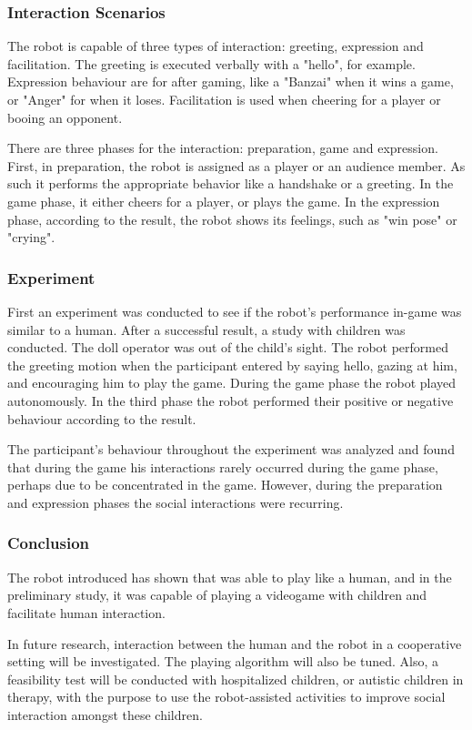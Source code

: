 \documentclass[runningheads]{llncs}
\begin{document}
\subsubsection{Interaction Scenarios}
\par The robot is capable of three types of interaction: greeting, expression and facilitation. The greeting is executed verbally with a "hello", for example. Expression behaviour are for after gaming, like a "Banzai" when it wins a game, or "Anger" for when it loses. Facilitation is used when cheering for a player or booing an opponent.
\par There are three phases for the interaction: preparation, game and expression. First, in preparation, the robot is assigned as a player or an audience member. As such it performs the appropriate behavior like a handshake or a greeting. In the game phase, it either cheers for a player, or plays the game. In the expression phase, according to the result, the robot shows its feelings, such as "win pose" or "crying".

\subsubsection{Experiment}
\par First an experiment was conducted to see if the robot's performance in-game was similar to a human. After a successful result, a study with children was conducted. The doll operator was out of the child's sight. The robot performed the greeting motion when the participant entered by saying hello, gazing at him, and encouraging him to play the game. During the game phase the robot played autonomously. In the third phase the robot performed their positive or negative behaviour according to the result.
\par The participant's behaviour throughout the experiment was analyzed and found that during the game his interactions rarely occurred during the game phase, perhaps due to be concentrated in the game. However, during the preparation and expression phases the social interactions were recurring.

\subsubsection{Conclusion}
\par The robot introduced has shown that was able to play like a human, and in the preliminary study, it was capable of playing a videogame with children and facilitate human interaction.
\par In future research, interaction between the human and the robot in a cooperative setting will be investigated. The playing algorithm will also be tuned. Also, a feasibility test will be conducted with hospitalized children, or autistic children in therapy, with the purpose to use the robot-assisted activities to improve social interaction amongst these children.
\end{document}

